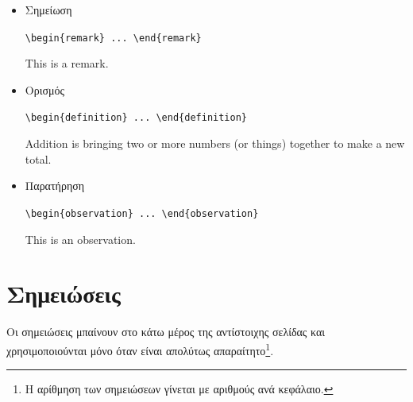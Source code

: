 \begin{itemize}
	\begin{center}\verb"\begin{fact} ... \end{fact}"\end{center}
	
	\begin{fact}
	It takes 8 minutes 17 seconds for light to travel from the Sun’s surface
	to the Earth.
	\end{fact}
	
	\item Σημείωση
	
	\begin{center}\verb"\begin{remark} ... \end{remark}"\end{center}
	
	\begin{remark}
	This is a remark.
	\end{remark}
	
	\item Ορισμός
	
	\begin{center}\verb"\begin{definition} ... \end{definition}"\end{center}
	
	\begin{definition}
	Addition is bringing two or more numbers (or things) together to make a
	new total.
	\end{definition}
	
	\item Παρατήρηση
	
	\begin{center}\verb"\begin{observation} ... \end{observation}"\end{center}
	
	\begin{observation}
	This is an observation.
	\end{observation}
\end{itemize}


\color{red}
\section{Σημειώσεις}
\label{sec:Footnotes}

Οι σημειώσεις μπαίνουν στο κάτω μέρος της αντίστοιχης σελίδας και
χρησιμοποιούνται μόνο όταν είναι απολύτως απαραίτητο\footnote{Η
αρίθμηση των σημειώσεων γίνεται με αριθμούς ανά κεφάλαιο.}.




